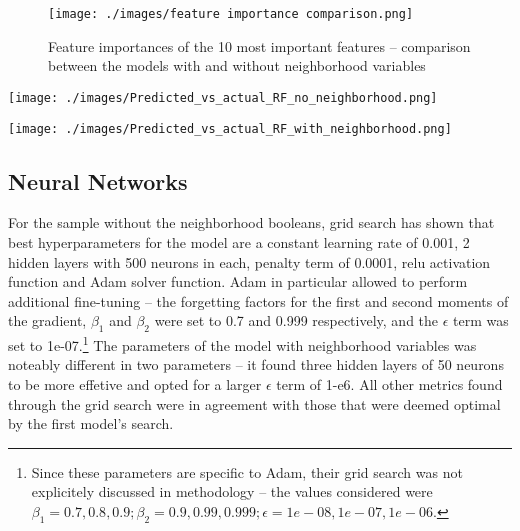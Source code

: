 \documentclass[12pt]{report}
\begin{document}
\begin{figure}[ht]
	\centering
	\texttt{[image: ./images/feature importance comparison.png]}
	\caption{Feature importances of the 10 most important features -- comparison between the models with and without neighborhood variables}
	\label{fig:rf-importances}
\end{figure}

\begin{minipage}[t]{0.5\textwidth}
	\centering
	\texttt{[image: ./images/Predicted\_vs\_actual\_RF\_no\_neighborhood.png]}
	\label{fig:rf-scatterplot-test-no-neighborhood}
\end{minipage}
\begin{minipage}[t]{0.5\textwidth}
	\centering
	\texttt{[image: ./images/Predicted\_vs\_actual\_RF\_with\_neighborhood.png]}
	\label{fig:rf-scatterplot-test}
\end{minipage}

\subsection{Neural Networks}
For the sample without the neighborhood booleans, grid search has shown that best hyperparameters for the model are a constant learning rate of 0.001, 2 hidden layers with 500 neurons in each, penalty term of 0.0001, relu activation function and Adam solver function. Adam in particular allowed to perform additional fine-tuning -- the forgetting factors for the first and second moments of the gradient, $\beta_{1}$ and $\beta_{2}$ were set to 0.7 and 0.999 respectively, and the $\epsilon$ term was set to 1e-07.\footnote{Since these parameters are specific to Adam, their grid search was not explicitely discussed in methodology -- the values considered were $\beta_1=0.7, 0.8, 0.9; \beta_2=0.9, 0.99, 0.999; \epsilon=1e-08, 1e-07, 1e-06$.} The parameters of the model with neighborhood variables was noteably different in two parameters -- it found three hidden layers of 50 neurons to be more effetive and opted for a larger $\epsilon$ term of 1-e6. All other metrics found through the grid search were in agreement with those that were deemed optimal by the first model's search.
\end{document}
